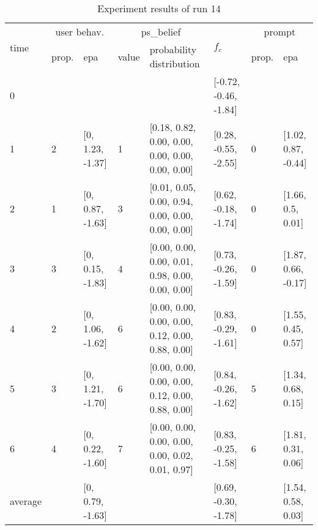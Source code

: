 \begin{table}[htbp]\footnotesize
\caption{Experiment results of run 14}
\begin{tabular}{|p{0.4cm}|p{0.6cm}|l|p{0.6cm}|p{3.3cm}|l|p{0.6cm}|l|}
\hline

\multirow{2}{*}{time} & \multicolumn{2}{c|}{user behav.} & \multicolumn{2}{c|}{ps\_belief} &
\multirow{2}{*}{$f_c$} & \multicolumn{2}{c|}{prompt} \\ \cline{2-5}\cline{ 7- 8}
& prop. & epa & value & probability distribution &  & prop. & epa \\ \hline

0 & \multicolumn{1}{l|}{} &  & \multicolumn{1}{l|}{} &  & [-0.72, -0.46, -1.84] & \multicolumn{1}{l|}{} &  \\ \hline
1 & 2 & [0, 1.23, -1.37] & 1 & [0.18, 0.82, 0.00, 0.00, 0.00, 0.00, 0.00, 0.00] & [0.28, -0.55, -2.55] & 0 & [1.02, 0.87, -0.44] \\ \hline
2 & 1 & [0, 0.87, -1.63] & 3 & [0.01, 0.05, 0.00, 0.94, 0.00, 0.00, 0.00, 0.00] & [0.62, -0.18, -1.74] & 0 & [1.66, 0.5, 0.01] \\ \hline
3 & 3 & [0, 0.15, -1.83] & 4 & [0.00, 0.00, 0.00, 0.01, 0.98, 0.00, 0.00, 0.00] & [0.73, -0.26, -1.59] & 0 & [1.87, 0.66, -0.17] \\ \hline
4 & 2 & [0, 1.06, -1.62] & 6 & [0.00, 0.00, 0.00, 0.00, 0.12, 0.00, 0.88, 0.00] & [0.83, -0.29, -1.61] & 0 & [1.55, 0.45, 0.57] \\ \hline
5 & 3 & [0, 1.21, -1.70] & 6 & [0.00, 0.00, 0.00, 0.00, 0.12, 0.00, 0.88, 0.00] & [0.84, -0.26, -1.62] & 5 & [1.34, 0.68, 0.15] \\ \hline
6 & 4 & [0, 0.22, -1.60] & 7 & [0.00, 0.00, 0.00, 0.00, 0.00, 0.02, 0.01, 0.97] & [0.83, -0.25, -1.58] & 6 & [1.81, 0.31, 0.06] \\ \hline
\multicolumn{1}{|l|}{average} & \multicolumn{1}{l|}{} & [0, 0.79, -1.63] & \multicolumn{1}{l|}{} &  & [0.69, -0.30, -1.78] & \multicolumn{1}{l|}{} & [1.54, 0.58, 0.03] \\ \hline
\end{tabular}
\label{}
\end{table}


